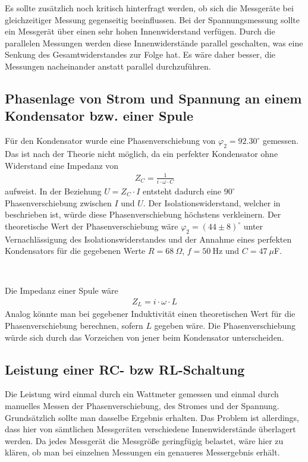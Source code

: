 \documentclass{article}
\begin{document}
Es sollte zusätzlich noch kritisch hinterfragt werden, ob sich die Messgeräte bei gleichzeitiger Messung gegenseitig beeinflussen. Bei der Spannungsmessung sollte ein Messgerät über einen sehr hohen Innenwiderstand verfügen. Durch die parallelen Messungen werden diese Innenwiderstände parallel geschalten, was eine Senkung des Gesamtwiderstandes zur Folge hat. Es wäre daher besser, die Messungen nacheinander anstatt parallel durchzuführen.


\subsection{Phasenlage von Strom und Spannung an einem Kondensator bzw. einer Spule}

Für den Kondensator wurde eine Phasenverschiebung von $\varphi_2 = 92.30^\circ$ gemessen. Das ist nach der Theorie nicht möglich, da ein perfekter Kondensator ohne Widerstand eine Impedanz von 
\begin{align*}
Z_C = \frac{1}{i\cdot\omega \cdot C}
\end{align*}
aufweist. In der Beziehung $U=Z_C\cdot I$ entsteht dadurch eine $90^\circ$ Phasenverschiebung zwischen $I$ und $U$. Der Isolationswiderstand, welcher in \cite{moodle} beschrieben ist, würde diese Phasenverschiebung höchstens verkleinern. Der theoretische Wert der Phasenverschiebung wäre $\varphi_2 = (44\pm8)^\circ$ unter Vernachlässigung des Isolationswiderstandes und der Annahme eines perfekten Kondensators für die gegebenen Werte $R = 68~\Omega$, $f=50~$Hz und $C=47~\mu$F.

~

Die Impedanz einer Spule wäre 
\begin{align*}
Z_L = i\cdot\omega \cdot L
\end{align*}
Analog könnte man bei gegebener Induktivität einen theoretischen Wert für die Phasenverschiebung berechnen, sofern $L$ gegeben wäre. Die Phasenverschiebung würde sich durch das Vorzeichen von jener beim Kondensator unterscheiden.


\subsection{Leistung einer RC- bzw RL-Schaltung}

Die Leistung wird einmal durch ein Wattmeter gemessen und einmal durch manuelles Messen der Phasenverschiebung, des Stromes und der Spannung. Grundsätzlich sollte man dasselbe Ergebnis erhalten. Das Problem ist allerdings, dass hier von sämtlichen Messgeräten verschiedene Innenwiderstände überlagert werden.  Da jedes Messgerät die Messgröße geringfügig belastet, wäre hier zu klären, ob man bei einzelnen Messungen ein genaueres Messergebnis erhält. 
\end{document}

